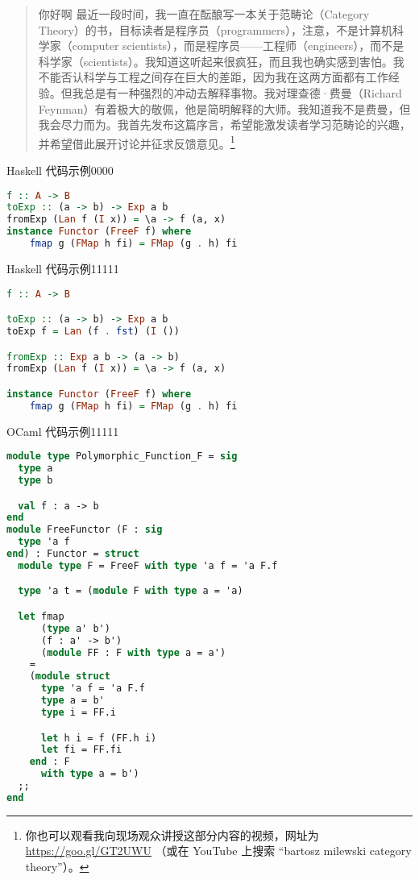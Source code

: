 \begin{quote}
  你好啊
  最近一段时间，我一直在酝酿写一本关于范畴论（Category Theory）的书，目标读者是程序员（programmers），注意，不是计算机科学家（computer scientists），而是程序员——工程师（engineers），而不是科学家（scientists）。我知道这听起来很疯狂，而且我也确实感到害怕。我不能否认科学与工程之间存在巨大的差距，因为我在这两方面都有工作经验。但我总是有一种强烈的冲动去解释事物。我对理查德·费曼（Richard Feynman）有着极大的敬佩，他是简明解释的大师。我知道我不是费曼，但我会尽力而为。我首先发布这篇序言，希望能激发读者学习范畴论的兴趣，并希望借此展开讨论并征求反馈意见。\footnote{
    你也可以观看我向现场观众讲授这部分内容的视频，网址为 \href{https://goo.gl/GT2UWU}{https://goo.gl/GT2UWU} （或在 YouTube 上搜索 “bartosz milewski category theory”）。}
\end{quote}

{Haskell 代码示例0000}
\begin{lstlisting}[language=Haskell]
f :: A -> B
toExp :: (a -> b) -> Exp a b
fromExp (Lan f (I x)) = \a -> f (a, x)
instance Functor (FreeF f) where
    fmap g (FMap h fi) = FMap (g . h) fi
\end{lstlisting}

{Haskell 代码示例11111}
\begin{lstlisting}[language=Haskell]
f :: A -> B

toExp :: (a -> b) -> Exp a b
toExp f = Lan (f . fst) (I ())

fromExp :: Exp a b -> (a -> b)
fromExp (Lan f (I x)) = \a -> f (a, x)

instance Functor (FreeF f) where
    fmap g (FMap h fi) = FMap (g . h) fi
\end{lstlisting}

{OCaml 代码示例11111}
\begin{lstlisting}[language=Caml]
module type Polymorphic_Function_F = sig
  type a
  type b

  val f : a -> b
end
module FreeFunctor (F : sig
  type 'a f
end) : Functor = struct
  module type F = FreeF with type 'a f = 'a F.f

  type 'a t = (module F with type a = 'a)

  let fmap
      (type a' b')
      (f : a' -> b')
      (module FF : F with type a = a')
    =
    (module struct
      type 'a f = 'a F.f
      type a = b'
      type i = FF.i

      let h i = f (FF.h i)
      let fi = FF.fi
    end : F
      with type a = b')
  ;;
end

\end{lstlisting}

